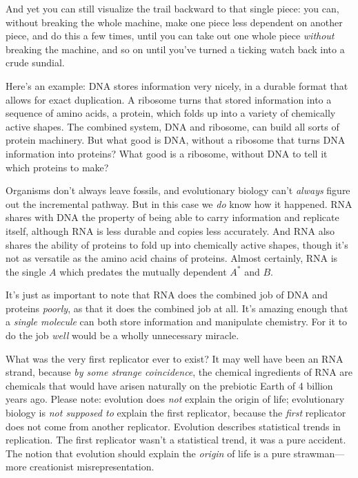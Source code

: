 {
 And yet you can still visualize the trail backward to that single
piece: you can, without breaking the whole machine, make one piece less
dependent on another piece, and do this a few times, until you can take
out one whole piece \textit{without} breaking the machine, and so on
until you've turned a ticking watch back into a crude
sundial.}

{
 Here's an example: DNA stores information very
nicely, in a durable format that allows for exact duplication. A
ribosome turns that stored information into a sequence of amino acids,
a protein, which folds up into a variety of chemically active shapes.
The combined system, DNA and ribosome, can build all sorts of protein
machinery. But what good is DNA, without a ribosome that turns DNA
information into proteins? What good is a ribosome, without DNA to tell
it which proteins to make?}

{
 Organisms don't always leave fossils, and
evolutionary biology can't \textit{always} figure out
the incremental pathway. But in this case we \textit{do} know how it
happened. RNA shares with DNA the property of being able to carry
information and replicate itself, although RNA is less durable and
copies less accurately. And RNA also shares the ability of proteins to
fold up into chemically active shapes, though it's not
as versatile as the amino acid chains of proteins. Almost certainly,
RNA is the single $A$ which predates the mutually dependent
$A^{*}$ and $B$.}

{
 It's just as important to note that RNA does the
combined job of DNA and proteins \textit{poorly}, as that it does the
combined job at all. It's amazing enough that a
\textit{single molecule} can both store information and manipulate
chemistry. For it to do the job \textit{well} would be a wholly
unnecessary miracle.}

{
 What was the very first replicator ever to exist? It may well have
been an RNA strand, because \textit{by some strange coincidence}, the
chemical ingredients of RNA are chemicals that would have arisen
naturally on the prebiotic Earth of 4 billion years ago. Please note:
evolution does \textit{not} explain the origin of life; evolutionary
biology is \textit{not supposed to} explain the first replicator,
because the \textit{first} replicator does not come from another
replicator. Evolution describes statistical trends in replication. The
first replicator wasn't a statistical trend, it was a
pure accident. The notion that evolution should explain the
\textit{origin} of life is a pure strawman---more creationist
misrepresentation.}

